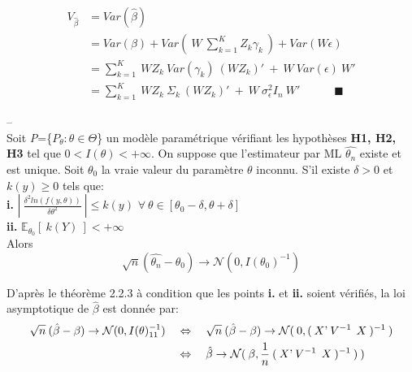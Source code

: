 \documentclass[12pt,fleqn]{book} %
\begin{document}
\begin{align*}
V_{\hat{\beta}} &= Var(\hat{\beta})\\
&=Var(\beta) +  Var(\:W \:\sum_{k=1}^{K} Z_k \gamma_k\:) + Var(W\epsilon)\\
&=\sum_{k=1}^{K} \:W Z_k\: Var(\gamma_k) \: (W Z_k)'\:+\:W \:Var(\epsilon)\: W'\\
&=\sum_{k=1}^{K} \:W Z_k\:\Sigma_k \:(W Z_k)'\:+\:W \: \sigma_{\epsilon}^2 I_n\: W' \quad\quad\quad \blacksquare
\end{align*}

 \vspace{2em}
 
 \begin{theorem}
 --\\
 Soit \textit{P}=\{$P_{\theta} : \theta\in\Theta$\} un modèle paramétrique vérifiant les hypothèses \textbf{H1, H2, H3} tel que $0 <I(\theta)<+\infty$. On suppose que l'estimateur par ML $\hat{\theta_n}$ existe et est unique. Soit $\theta_0$ la vraie valeur du paramètre $\theta$ inconnu. S'il existe $\delta>0$ et $k(y)\geq 0$ tels que:\\
 \textbf{i.} \quad $\left|\: \frac{\delta^2 ln(f(y,\theta))}{\delta\theta^2} \:\right| \leq k(y)$ \quad $\forall\: \theta \in [\theta_0-\delta,\theta+\delta]$\\
 \textbf{ii.} \quad $\mathbb{E}_{\theta_0}[\:k(Y)\:]<+\infty$\\
 Alors\\
 \[
 \sqrt{n}(\hat{\theta_n}-\theta_0)\rightarrow \mathcal{N}(0,I(\theta_0)^{-1})
 \]
 
 \end{theorem}

\vspace{2em}

D'après le théorème 2.2.3 à condition que les points \textbf{i.} et \textbf{ii.} soient vérifiés, la loi asymptotique de $\hat{\beta}$ est donnée par:
\begin{align*}
 \sqrt{n}\:(\hat{\beta}-\beta)\rightarrow \mathcal{N}(0,I(\theta)_{11}^{-1}) \quad
 &\Leftrightarrow \quad \sqrt{n}\:(\hat{\beta}-\beta)\rightarrow \mathcal{N}(\:0,(\:X\textnormal{'} \:V^{-1}\:\: X\:)^{-1}\:)\\
 &\Leftrightarrow \quad \hat{\beta} \rightarrow \mathcal{N}(\:\beta,\frac{1}{n}\:(\:X\textnormal{'} \:V^{-1}\:\: X\:)^{-1}\:)\:)
 \end{align*}

\newpage
\end{document}
